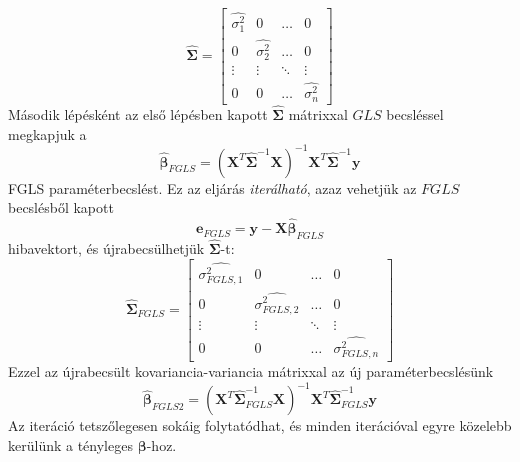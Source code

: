 \documentclass[14p]{report}
\def\pmb{\boldsymbol}
\def\ebeta{\hat{\pmb{\beta}}}
\begin{document}
	\[
		\widehat{\pmb{\Sigma}} = 
		\begin{bmatrix}
			\widehat{\sigma_1^2} & 0 & \dots & 0 \\
			0 & \widehat{\sigma_2^2} & \dots & 0 \\
			\vdots & \vdots & \ddots & \vdots \\
			0 & 0 & \dots & \widehat{\sigma_n^2}
		\end{bmatrix}
	\]
	Második lépésként az első lépésben kapott $\widehat{\pmb{\Sigma}}$ mátrixxal $GLS$ becsléssel megkapjuk a
	\[
		\ebeta_{FGLS} = (\pmb{X}^T\widehat{\pmb{\Sigma}}^{-1}\pmb{X})^{-1}\pmb{X}^T\widehat{\pmb{\Sigma}}^{-1}\pmb{y}
	\]
	FGLS paraméterbecslést. Ez az eljárás \emph{iterálható}, azaz vehetjük az $FGLS$ becslésből kapott
	\[
		\pmb{e}_{FGLS} = \pmb{y} - \pmb{X}\ebeta_{FGLS}
	\]
	hibavektort, és újrabecsülhetjük $\widehat{\pmb{\Sigma}}$-t:
	\[
		\widehat{\pmb{\Sigma}}_{FGLS} =
		\begin{bmatrix}
			\widehat{\sigma_{FGLS,1}^2} & 0 & \dots & 0 \\
			0 & \widehat{\sigma_{FGLS,2}^2} & \dots & 0 \\
			\vdots & \vdots & \ddots & \vdots \\
			0 & 0 & \dots & \widehat{\sigma_{FGLS,n}^2}
		\end{bmatrix}
	\]
	Ezzel az újrabecsült kovariancia-variancia mátrixxal az új paraméterbecslésünk
	\[
		\ebeta_{FGLS2} = (\pmb{X}^T\widehat{\pmb{\Sigma}}_{FGLS}^{-1}\pmb{X})^{-1}\pmb{X}^T\widehat{\pmb{\Sigma}}_{FGLS}^{-1}\pmb{y}
	\]
	Az iteráció tetszőlegesen sokáig folytatódhat, és minden iterációval egyre közelebb kerülünk a tényleges $\pmb{\beta}$-hoz.
	
\end{document}
